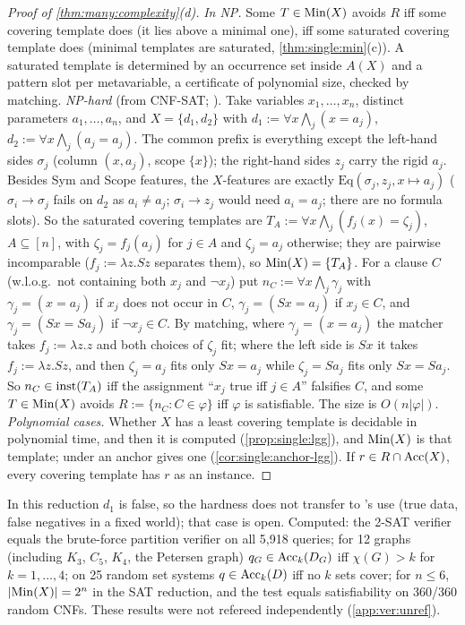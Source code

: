 \begin{proof}[Proof of \cref{thm:many:complexity}(d)]
\emph{In NP.} Some $T\in\mathrm{Min}(X)$ avoids $R$ iff some covering template does (it lies above a minimal one), iff some saturated
covering template does (minimal templates are saturated, \cref{thm:single:min}(c)). A saturated template is determined by an
occurrence set inside $A(X)$ and a pattern slot per metavariable, a certificate of polynomial size, checked by matching.
\emph{NP-hard} (from CNF-SAT; \citealp{garey1979computers}). Take variables $x_1,\dots,x_n$, distinct parameters
$a_1,\dots,a_n$, and $X=\{d_1,d_2\}$ with $d_1:=\forall x\bigwedge_j(x=a_j)$, $d_2:=\forall x\bigwedge_j(a_j=a_j)$. The common prefix
is everything except the left-hand sides $\sigma_j$ (column $(x,a_j)$, scope $\{x\}$); the right-hand sides $z_j$ carry the
rigid $a_j$. Besides Sym and Scope features, the $X$-features are exactly $\mathrm{Eq}(\sigma_j,z_j,x\mapsto a_j)$ ($\sigma_i\to
\sigma_j$ fails on $d_2$ as $a_i\neq a_j$; $\sigma_i\to z_j$ would need $a_i=a_j$; there are no formula slots). So the saturated
covering templates are $T_A:=\forall x\bigwedge_j(f_j(x)=\zeta_j)$, $A\subseteq[n]$, with $\zeta_j=f_j(a_j)$ for $j\in A$ and
$\zeta_j=a_j$ otherwise; they are pairwise incomparable ($f_j:=\lambda z.Sz$ separates them), so $\mathrm{Min}(X)=\{T_A\}$. For a clause $C$
(w.l.o.g.\ not containing both $x_j$ and $\neg x_j$) put $n_C:=\forall x\bigwedge_j\gamma_j$ with $\gamma_j=(x=a_j)$ if $x_j$ does not
occur in $C$, $\gamma_j=(Sx=a_j)$ if $x_j\in C$, and $\gamma_j=(Sx=Sa_j)$ if $\neg x_j\in C$. By matching, where $\gamma_j=(x=a_j)$ the
matcher takes $f_j:=\lambda z.z$ and both choices of $\zeta_j$ fit; where the left side is $Sx$ it takes $f_j:=\lambda z.Sz$, and
then $\zeta_j=a_j$ fits only $Sx=a_j$ while $\zeta_j=Sa_j$ fits only $Sx=Sa_j$. So $n_C\in\mathrm{inst}(T_A)$ iff the assignment ``$x_j$ true
iff $j\in A$'' falsifies $C$, and some $T\in\mathrm{Min}(X)$ avoids $R:=\{n_C:C\in\varphi\}$ iff $\varphi$ is satisfiable. The size is
$O(n|\varphi|)$. \emph{Polynomial cases.} Whether $X$ has a least covering template is decidable in polynomial time, and then
it is computed (\cref{prop:single:lgg}), and $\mathrm{Min}(X)$ is that template; under \Rich{} an anchor gives one
(\cref{cor:single:anchor-lgg}). If
$r\in R\cap\mathrm{Acc}(X)$, every covering template has $r$ as an instance.
\end{proof}
In this reduction $d_1$ is false, so the hardness does not transfer to \DTRC's use (true data, false negatives in a fixed
world); that case is open. Computed: the 2-SAT verifier equals the brute-force partition verifier on all
5{,}918 queries; for 12 graphs (including $K_3$, $C_5$, $K_4$, the Petersen graph) $q_G\in\mathrm{Acc}_k(D_G)$ iff $\chi(G)>k$ for
$k=1,\dots,4$; on 25 random set systems $q\in\mathrm{Acc}_k(D)$ iff no $k$ sets cover; for $n\le6$, $|\mathrm{Min}(X)|=2^n$ in the SAT
reduction, and the test equals satisfiability on 360/360 random CNFs. These results were not refereed independently
(\cref{app:ver:unref}).

